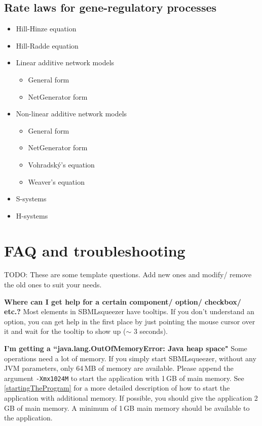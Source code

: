 \section{Rate laws for gene-regulatory processes}
\begin{itemize}
  \item Hill-Hinze equation \citep{Hinze2007}
  \item Hill-Radde equation \citep{Radde2007a, Radde2007}
  \item Linear additive network models
    \begin{itemize}
      \item General form
      \item NetGenerator form \citep{Toepfer2007}
    \end{itemize}
  \item Non-linear additive network models
    \begin{itemize}
      \item General form
      \item NetGenerator form \citep{Toepfer2007}
      \item Vohradsk{\'y}'s equation \citep{Vu2007}
      \item Weaver's equation \citep{Weaver1999}
    \end{itemize}
  \item S-systems \citep{Savageau1969, spieth04optimizing, Tournier2005, Spieth2006, Hecker2009}
  \item H-systems \citep{Spieth2006}
\end{itemize}


\chapter{FAQ and troubleshooting}
\label{ch:faq}

TODO: These are some template questions. Add new ones and modify/ remove the
old ones to suit your needs.

\noindent \textbf{Where can I get help for a certain component/ option/ checkbox/ etc.?}\newline
Most elements in SBMLsqueezer have tooltips. If you don't understand an option, you
can get help in the first place by just pointing the mouse cursor over it and
wait for the tooltip to show up ($\sim$ 3 seconds).\newline

\noindent \textbf{I'm getting a ``java.lang.OutOfMemoryError: Java heap space"}\newline
Some operations need a lot of memory. If you simply start SBMLsqueezer, without any
JVM parameters, only 64\,MB of memory are available. Please append the argument
\texttt{-Xmx1024M} to start the application with 1\,GB of main memory. See
\vref{startingTheProgram} for a more detailed description of how to
start the application with additional memory. If possible, you should give the
application 2\,GB of main memory. A minimum of 1\,GB main memory should be
available to the application.\newline

